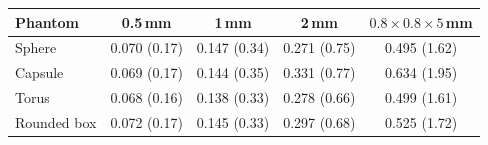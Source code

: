 \begin{tabular}{lcccc}
\toprule
Phantom & 0.5\,mm & 1\,mm & 2\,mm & $0.8\times0.8\times5$\,mm \\
\midrule
Sphere & 0.070 (0.17) & 0.147 (0.34) & 0.271 (0.75) & 0.495 (1.62) \\
Capsule & 0.069 (0.17) & 0.144 (0.35) & 0.331 (0.77) & 0.634 (1.95) \\
Torus & 0.068 (0.16) & 0.138 (0.33) & 0.278 (0.66) & 0.499 (1.61) \\
Rounded box & 0.072 (0.17) & 0.145 (0.33) & 0.297 (0.68) & 0.525 (1.72) \\
\bottomrule
\end{tabular}
